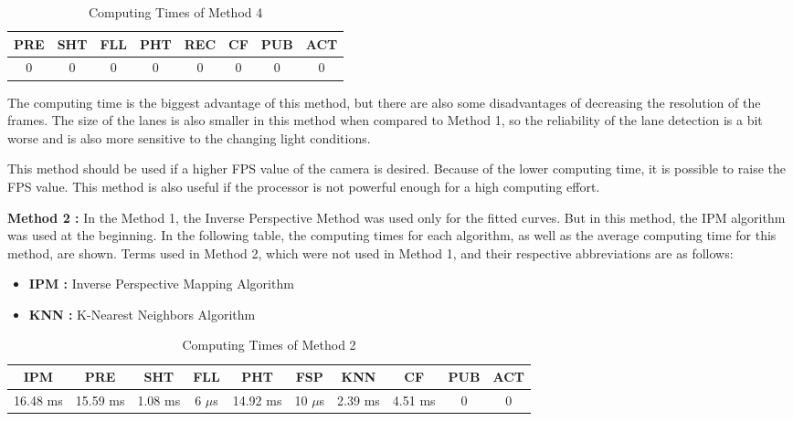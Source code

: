 \begin{table}[ht]
\caption{Computing Times of Method 4} 
\centering 
  \begin{tabular}{ | c | c | c | c | c | c | c | c |}
    \hline
  
  PRE & SHT & FLL & PHT & REC & CF & PUB & ACT \\ \hline  
  0   &  0  &  0  &  0  &  0  &  0 &  0  &  0 \\ \hline  
    
    
      \end{tabular}
  \label{tab:Case4_Times}
\end{table}

The computing time is the biggest advantage of this method, but there are also some disadvantages of decreasing the resolution of the frames. The size of the lanes is also smaller in this method when compared to Method 1, so the reliability of the lane detection is a bit worse and is also more sensitive to the changing light conditions.

This method should be used if a higher FPS value of the camera is desired. Because of the lower computing time, it is possible to raise the FPS value. This method is also useful if the processor is not powerful enough for a high computing effort.







\textbf{Method 2 : }In the Method 1, the Inverse Perspective Method was used only for the fitted curves.
But in this method, the IPM algorithm was used at the beginning. In the following table, the computing times for each algorithm, as well as the average computing time for this method, are shown. Terms used in Method 2, which were not used in Method 1, and their respective abbreviations are as follows:


\begin{itemize}[noitemsep]
\item\textbf{IPM : }Inverse Perspective Mapping Algorithm
\item\textbf{KNN : }K-Nearest Neighbors Algorithm
\end{itemize}


\begin{table}[ht]
\caption{Computing Times of Method 2} 
\centering 
  \begin{tabular}{ | c | c | c | c | c | c | c | c | c | c |}
    \hline
  
  IPM 		& PRE 		& SHT	   & FLL 	   & PHT 	   & FSP 	    & KNN 	   & CF 	  & PUB 	& ACT \\ \hline  
  16.48 ms & 15.59 ms & 1.08 ms & 6 $\mu$s & 14.92 ms & 10 $\mu$s & 2.39 ms & 4.51 ms & 0       & 0   \\ \hline  
    
      \end{tabular}
  \label{tab:Case2_Times}
\end{table}

